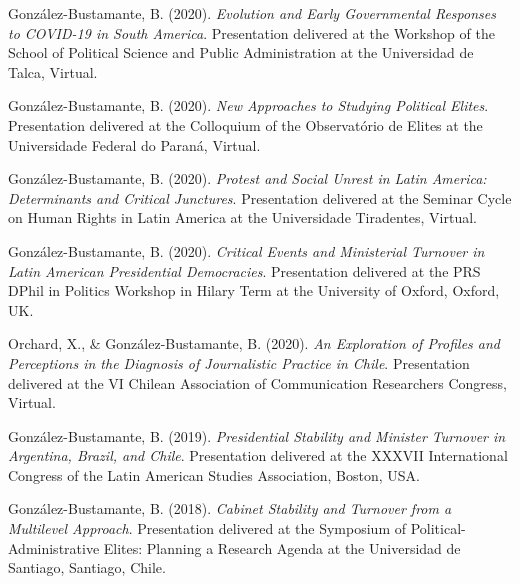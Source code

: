 \begin{publications}
\begin{benumerate}{77}
\item{\small González-Bustamante, B. (2020). {\itshape Evolution and Early Governmental Responses to COVID-19 in South America}. Presentation delivered at the Workshop of the School of Political Science and Public Administration at the Universidad de Talca, Virtual.}\vspace{1mm}

\item{\small González-Bustamante, B. (2020). {\itshape New Approaches to Studying Political Elites}. Presentation delivered at the Colloquium of the Observatório de Elites at the Universidade Federal do Paraná, Virtual.}\vspace{1mm}

\item{\small González-Bustamante, B. (2020). {\itshape Protest and Social Unrest in Latin America: Determinants and Critical Junctures}. Presentation delivered at the Seminar Cycle on Human Rights in Latin America at the Universidade Tiradentes, Virtual.}\vspace{1mm} %

\item{\small González-Bustamante, B. (2020). {\itshape Critical Events and Ministerial Turnover in Latin American Presidential Democracies}. Presentation delivered at the PRS DPhil in Politics Workshop in Hilary Term at the University of Oxford, Oxford, UK.}\vspace{1mm}

\item{\small Orchard, X., \& González-Bustamante, B. (2020). {\itshape An Exploration of Profiles and Perceptions in the Diagnosis of Journalistic Practice in Chile}. Presentation delivered at the VI Chilean Association of Communication Researchers Congress, Virtual.}\vspace{1mm}

\item{\small González-Bustamante, B. (2019). {\itshape Presidential Stability and Minister Turnover in Argentina, Brazil, and Chile}. Presentation delivered at the XXXVII International Congress of the Latin American Studies Association, Boston, USA.}\vspace{1mm}

\item{\small González-Bustamante, B. (2018). {\itshape Cabinet Stability and Turnover from a Multilevel Approach}. Presentation delivered at the Symposium of Political-Administrative Elites: Planning a Research Agenda at the Universidad de Santiago, Santiago, Chile.}\vspace{1mm}


\end{benumerate}
\end{publications}
